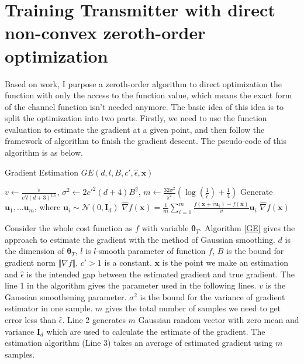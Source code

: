 \documentclass[12pt,a4paper]{article}
\begin{document}
	\section{Training Transmitter with direct non-convex zeroth-order optimization}
	\noindent
	\par Based on \cite{jin2017escape} work, I purpose a zeroth-order algorithm to direct optimization the function with only the access to the function value, which means the exact form of the channel function isn't needed anymore. The basic idea of this idea is to split the optimization into two parts. Firstly, we need to use the function evaluation to estimate the gradient at a given point, and then follow the framework of \cite{jin2017escape} algorithm to finish the gradient descent. The pseudo-code of this algorithm is as below.	
	\begin{algorithm}[h]
		\label{GE}
		\caption{Gradient Estimation $GE({d,l,B,c',\hat{\epsilon},\bm{x}})$}
		\begin{algorithmic}[1]
			\State $v\leftarrow\frac{\hat{\epsilon}}{c'l(d+3)^{1.5}}$, $\sigma^2\leftarrow2c'^{2}(d+4)B^2$, $m\leftarrow\frac{32\sigma^2}{\hat{\epsilon}^2}(\log(\frac{1}{\hat{\epsilon}})+\frac{1}{4})$
			\State Generate $\bm{u}_1,...\bm{u}_m$, where $\bm{u}_i\sim\mathcal{N}(0,\mathbf{I}_d)$
			\State $\hat{\nabla}f(\bm{x})=\frac{1}{m}\sum_{i=1}^{m}\frac{f(\bm{x}+v\bm{u}_i)-f(\bm{x})}{v}\bm{u}_i$ 
			\State \Return $\hat{\nabla}f(\bm{x})$
		\end{algorithmic}
	\end{algorithm}
	\par Consider the whole cost function as $f$ with variable $\bm{\theta}_T$. Algorithm  \ref{GE} gives the approach to estimate the gradient with the method of Gaussian smoothing. $d$ is the dimension of $\bm{\theta}_T$,  $l$ is $l$-smooth parameter of function $f$, $B$ is the bound for gradient norm $\Vert \nabla f\Vert$, $c'>1$ is a constant. $\bm{x}$ is the point we make an estimation and $\hat{\epsilon}$ is the intended gap between the estimated gradient and true gradient. The line 1 in the algorithm gives the parameter used in the following lines. $v$ is the Gaussian smoothening parameter. $\sigma^2$ is the bound for the variance of gradient estimator in one sample. $m$ gives the total number of samples we need to get error less than $\hat{\epsilon}$. Line 2 generates $m$ Gaussian random vector with zero mean and variance $\mathbf{I}_d$ which are used to calculate the estimate of the gradient. The estimation algorithm (Line 3) takes an average of estimated gradient using $m$ samples. 
\end{document}
